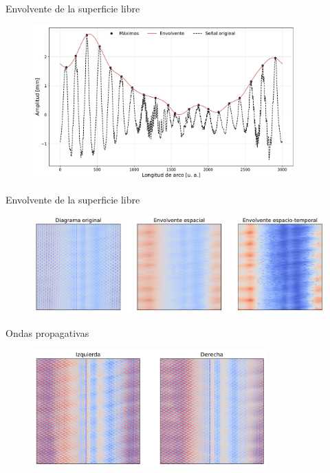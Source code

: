 \documentclass[aspectratio=169]{beamer}
\begin{document}
\begin{frame}{Envolvente de la superficie libre}
	\begin{figure}[ht]
		\includegraphics[width=0.9\textwidth]{figs/env_1sample.pdf}
	\end{figure}
\end{frame}

\begin{frame}{Envolvente de la superficie libre}
	\begin{figure}[ht]
		\centering
		\includegraphics[width=\textwidth]{figs/st_envelopes.pdf}
	\end{figure}
\end{frame}

\begin{frame}{Ondas propagativas}
	\begin{figure}[ht]
		\centering
		\includegraphics[width=0.8\textwidth]{figs/st_left_right.pdf}
	\end{figure}
\end{frame}
\end{document}
